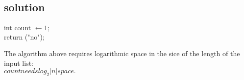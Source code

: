 \documentclass[a4paper,parskip=half]{scrartcl}
\begin{document}
\thispagestyle{scrheadings} ~

\subsection{solution}
\hfill \newline

\begin{algorithm}
		int count $\leftarrow 1;$\\
		return ("no");
	\caption{}
	\label{alg:n-sorted}
\end{algorithm}%

The algorithm above requires logarithmic space in the sice of the length of the input list:\\
\newline
\bullet $ count needs log_2|n| space.$
\end{document}
